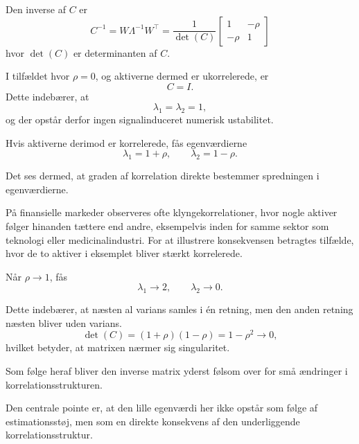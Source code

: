\documentclass[../main.tex]{subfiles}
\begin{document}
Den inverse af $C$ er
\begin{equation}
    C^{-1}=W\Lambda^{-1}W^\top=\frac{1}{\det(C)}
    \begin{bmatrix}
        1 & -\rho \\
        -\rho & 1
    \end{bmatrix}
    \label{eq:c_2x2_inverse}
\end{equation}
hvor $\det(C)$ er determinanten af $C$.

I tilfældet hvor $\rho = 0$, og aktiverne dermed er ukorrelerede, er
\begin{equation}
    C = I.
\end{equation}
Dette indebærer, at
\begin{equation}
    \lambda_1 = \lambda_2 = 1,
\end{equation}
og der opstår derfor ingen signalinduceret numerisk ustabilitet.

Hvis aktiverne derimod er korrelerede, fås egenværdierne
\begin{equation}
    \lambda_1 = 1 + \rho, \qquad \lambda_2 = 1 - \rho.
\end{equation}

Det ses dermed, at graden af korrelation direkte bestemmer spredningen i egenværdierne.

På finansielle markeder observeres ofte klyngekorrelationer, hvor nogle aktiver følger hinanden tættere end andre, eksempelvis inden for samme sektor som teknologi eller medicinalindustri. For at illustrere konsekvensen betragtes tilfælde, hvor de to aktiver i eksemplet bliver stærkt korrelerede.

Når $\rho \rightarrow 1$, fås
\begin{equation}
    \lambda_1 \rightarrow 2, \qquad \lambda_2 \rightarrow 0.
\end{equation}

Dette indebærer, at næsten al varians samles i én retning, men den anden retning næsten bliver uden varians.
\begin{equation}
    \det(C) = (1+\rho)(1-\rho) = 1 - \rho^2 \rightarrow 0,
\end{equation}
hvilket betyder, at matrixen nærmer sig singularitet.

Som følge heraf bliver den inverse matrix yderst følsom over for små ændringer i korrelationsstrukturen.

Den centrale pointe er, at den lille egenværdi her ikke opstår som følge af estimationsstøj, men som en direkte konsekvens af den underliggende korrelationsstruktur.
\end{document}

